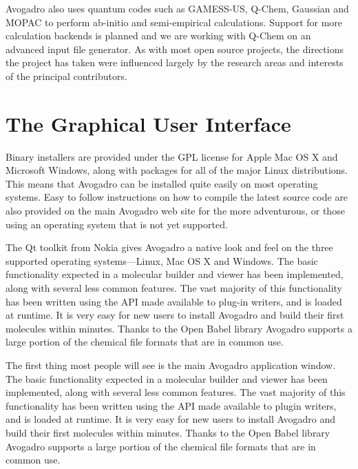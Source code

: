 \documentclass[10pt]{bmc_article}
\newenvironment{bmcformat}{\begin{raggedright}
\baselineskip20pt\sloppy\setboolean{publ}{false}}{\end{raggedright}
\baselineskip20pt\sloppy}
\begin{document}
\begin{bmcformat}
Avogadro also uses quantum codes such as GAMESS-US, Q-Chem, Gaussian and MOPAC
to perform ab-initio and semi-empirical calculations. Support for more
calculation backends is planned and we are working with Q-Chem on an advanced
input file generator. As with most open source projects, the directions the
project has taken were influenced largely by the research areas and interests of
the principal contributors.

\section{The Graphical User Interface}

Binary installers are provided under the GPL license for Apple Mac OS X and
Microsoft Windows, along with packages for all of the major Linux distributions.
This means that Avogadro can be installed quite easily on most operating
systems. Easy to follow instructions on how to compile the latest source code
are also provided on the main Avogadro web site for the more adventurous, or
those using an operating system that is not yet supported.

The Qt toolkit from Nokia gives Avogadro a native look and feel on the three
supported operating systems---Linux, Mac OS X and Windows. The basic
functionality expected in a molecular builder and viewer has been implemented,
along with several less common features. The vast majority of this functionality
has been written using the API made available to plug-in writers, and is loaded
at runtime. It is very easy for new users to install Avogadro and build their
first molecules within minutes. Thanks to the Open Babel library Avogadro
supports a large portion of the chemical file formats that are in common use.

The first thing most people will see is the main Avogadro application window.
The basic functionality expected in a molecular builder and viewer has been
implemented, along with several less common features. The vast majority of this
functionality has been written using the API made available to plugin writers,
and is loaded at runtime. It is very easy for new users to install Avogadro and
build their first molecules within minutes. Thanks to the Open Babel library
Avogadro supports a large portion of the chemical file formats that are in
common use.


\end{bmcformat}
\end{document}
